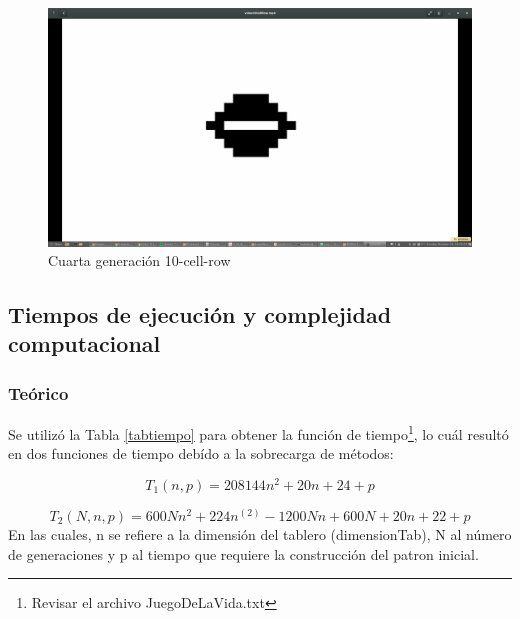 \documentclass[12pt,letterpaper]{article}
\begin{document}
\begin{figure}[H]
\centering
\includegraphics[height=12 cm, width=15cm]{img/Ejemplo10cellrow.png}
\caption{\label{video} Cuarta generación 10-cell-row}
\end{figure}

\newpage 
\subsection{Tiempos de ejecución y complejidad computacional}

\subsubsection{Teórico}
Se utilizó la Tabla \ref{tabtiempo} para obtener la función de tiempo\footnote{Revisar el archivo JuegoDeLaVida.txt}, lo cuál resultó en dos funciones de tiempo debído a la sobrecarga de métodos: 

\begin{equation}
T_{1}(n,p)= 208 144n^2 + 20n + 24 + p
\end{equation}

\begin{equation}
T_{2}(N,n,p)= 600Nn^2 + 224n^(2) - 1200Nn + 600N + 20n + 22 + p
\end{equation}
En las cuales, n se refiere a la dimensión del tablero (dimensionTab), N al número de generaciones y p al tiempo que requiere la construcción del patron inicial.
\end{document}
